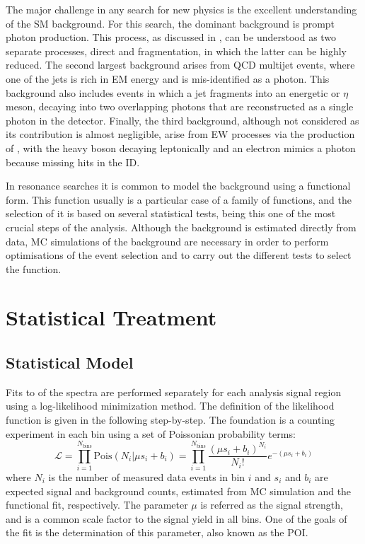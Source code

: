 The major challenge in any search for new physics is the excellent understanding of the \ac{SM} background. For this search, the dominant background is prompt photon production. This process, as discussed in \Sect{\ref{subsec:theory:sm:prompt_photon}}, can be understood as two separate processes, direct and fragmentation, in which the latter can be highly reduced. The second largest background arises from \ac{QCD} multijet events, where one of the jets is rich in \ac{EM} energy and is mis-identified as a photon. This background also includes events in which a jet fragments into an energetic \pizero or \(\eta\) meson, decaying into two overlapping photons that are reconstructed as a single photon in the detector. Finally, the third background, although not considered as its contribution is almost negligible, arise from \ac{EW} processes via the production of \WZjet, with the heavy boson decaying leptonically and an electron mimics a photon because missing hits in the \ac{ID}.


In resonance searches it is common to model the background using a functional form. This function usually is a particular case of a family of functions, and the selection of it is based on several statistical tests, being this one of the most crucial steps of the analysis. Although the background is estimated directly from data, \ac{MC} simulations of the background are necessary in order to perform optimisations of the event selection and to carry out the different tests to select the function.


\section{Statistical Treatment}
\label{sec:strategy:stat_treatment}






\subsection{Statistical Model}
\label{subsec:strategy:stat_treatment:stat_model}

Fits to of the \myj spectra are performed separately for each analysis signal region using a log-likelihood minimization method. The definition of the likelihood function is given in the following step-by-step. The foundation is a counting experiment in each bin using a set of Poissonian probability terms:
\begin{equation}
    \mathcal{L} = 
    \prod_{i=1}^{N_{\text{bins}}} \text{Pois}\left(N_i | \mu s_i + b_i\right) = 
    \prod_{i=1}^{N_{\text{bins}}} \frac{\left( \mu s_i + b_i \right)^{N_i}}{N_i !} e^{-\left( \mu s_i + b_i \right)}
\end{equation}
where \(N_i\) is the number of measured data events in bin \(i\) and \(s_i\) and \(b_i\) are expected signal and background counts, estimated from \ac{MC} simulation and the functional fit, respectively. The parameter \(\mu\) is referred as the signal strength, and is a common scale factor to the signal yield in all bins. One of the goals of the fit is the determination of this parameter, also known as the \ac{POI}.

